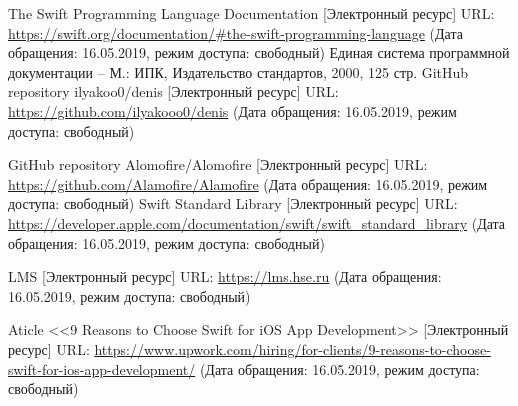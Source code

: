 \documentclass[a4paper,12pt]{article}
\begin{document}
\newpage
{}
\begin{thebibliography}{7}
	 The Swift Programming Language Documentation [Электронный ресурс] URL: \url{https://swift.org/documentation/#the-swift-programming-language} (Дата обращения: 16.05.2019, режим доступа: свободный)
	Единая система программной документации – М.: ИПК, Издательство стандартов, 2000, 125 стр.
	 GitHub repository ilyakoo0/denis [Электронный ресурс] URL: \url{https://github.com/ilyakooo0/denis} (Дата обращения: 16.05.2019, режим доступа: свободный)
	
	 GitHub repository Alomofire/Alomofire [Электронный ресурс] URL: \url{https://github.com/Alamofire/Alamofire} (Дата обращения: 16.05.2019, режим доступа: свободный)
	 Swift Standard Library [Электронный ресурс] URL: \url{https://developer.apple.com/documentation/swift/swift_standard_library} (Дата обращения: 16.05.2019, режим доступа: свободный)
	
	LMS [Электронный ресурс] URL: 
	\url{https://lms.hse.ru} (Дата обращения: 16.05.2019, режим доступа: свободный)
	
	Aticle <<9 Reasons to Choose Swift for iOS App Development>> [Электронный ресурс] URL: 
	\url{https://www.upwork.com/hiring/for-clients/9-reasons-to-choose-swift-for-ios-app-development/} (Дата обращения: 16.05.2019, режим доступа: свободный)
\end{thebibliography}

\newpage




	
						
						\newpage
	\listRegistration
\end{document}
